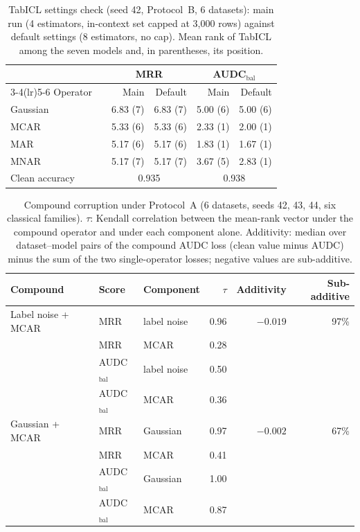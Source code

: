 \begin{table}[t]
\centering
\footnotesize
\caption{TabICL settings check (seed 42, Protocol~B, 6 datasets): main run (4 estimators, in-context set capped at 3,000 rows) against default settings (8 estimators, no cap). Mean rank of TabICL among the seven models and, in parentheses, its position.}
\label{tab:sens_settings}
\begin{tabular}{@{}llrrrr@{}}
\toprule
 & & \multicolumn{2}{c}{MRR} & \multicolumn{2}{c}{AUDC$_{\mathrm{bal}}$} \\
\cmidrule(lr){3-4}\cmidrule(lr){5-6}
Operator & & Main & Default & Main & Default \\
\midrule
Gaussian & & 6.83 (7) & 6.83 (7) & 5.00 (6) & 5.00 (6) \\
MCAR & & 5.33 (6) & 5.33 (6) & 2.33 (1) & 2.00 (1) \\
MAR & & 5.17 (6) & 5.17 (6) & 1.83 (1) & 1.67 (1) \\
MNAR & & 5.17 (7) & 5.17 (7) & 3.67 (5) & 2.83 (1) \\
\midrule
Clean accuracy & & \multicolumn{2}{c}{0.935} & \multicolumn{2}{c}{0.938} \\
\bottomrule
\end{tabular}
\end{table}

\begin{table}[t]
\centering
\footnotesize
\caption{Compound corruption under Protocol~A (6 datasets, seeds 42, 43, 44, six classical families). $\tau$: Kendall correlation between the mean-rank vector under the compound operator and under each component alone. Additivity: median over dataset--model pairs of the compound AUDC loss (clean value minus AUDC) minus the sum of the two single-operator losses; negative values are sub-additive.}
\label{tab:sens_compound}
\begin{tabular}{@{}lllrrr@{}}
\toprule
Compound & Score & Component & $\tau$ & Additivity & Sub-additive \\
\midrule
Label noise + MCAR & MRR & label noise & 0.96 & $-0.019$ & 97\% \\
 & MRR & MCAR & 0.28 &  &  \\
 & AUDC$_{\mathrm{bal}}$ & label noise & 0.50 &  &  \\
 & AUDC$_{\mathrm{bal}}$ & MCAR & 0.36 &  &  \\
\midrule
Gaussian + MCAR & MRR & Gaussian & 0.97 & $-0.002$ & 67\% \\
 & MRR & MCAR & 0.41 &  &  \\
 & AUDC$_{\mathrm{bal}}$ & Gaussian & 1.00 &  &  \\
 & AUDC$_{\mathrm{bal}}$ & MCAR & 0.87 &  &  \\
\bottomrule
\end{tabular}
\end{table}

